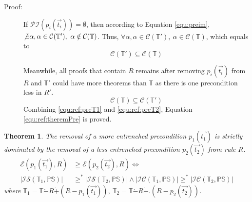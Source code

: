 \documentclass[11pt,letterpaper]{article}
\newtheorem{theorem}{Theorem}[section]
\newcommand{\theory}{\mathbb{T}}
\begin{document}
\begin{description}
\item[Proof:]
 If $\mathcal{PI}(p_i(\vec{t_i})) = \emptyset$, then according to Equation \ref{equ:preim}, $\not\exists \alpha, \alpha \in \mathcal{C}(\theory'),\ \alpha \notin \mathcal{C}(\theory)$. Thus, $\forall \alpha, \alpha \in \mathcal{C}(\theory'),\ \alpha \in \mathcal{C}(\theory)$, which equals to
 \begin{equation}\label{equ:ref:preT1}
     \mathcal{C}(\theory')\subseteq \mathcal{C}(\theory)
 \end{equation}
 
 Meanwhile, all proofs that contain $R$ remains after removing $p_i(\vec{t_i})$ from $R$ and $\theory'$ could have more theorems than $\theory$ as there is one precondition less in $R'$.
 \begin{equation}\label{equ:ref:preT2}
 \mathcal{C}(\theory)\subseteq \mathcal{C}(\theory')
 \end{equation}
 Combining \ref{equ:ref:preT1} and \ref{equ:ref:preT2}, Equation \ref{equ:ref:theremPre} is proved.
\end{description}


\begin{theorem}\label{the:def:precE}
The removal of a more entrenched precondition $p_1(\vec{t_1})$ is strictly dominated by the removal of a less entrenched precondition $p_2(\vec{t_2})$ from rule $R$.
\begin{align*}
    \mathcal{E}(p_1(\vec{t_1}), R) &\geq\mathcal{E}(p_2(\vec{t_2}), R) \iff   \\
    |\mathcal{IS}(\theory_1, \mathbb{PS}) | & \geq^*  |\mathcal{IS}(\theory_2, \mathbb{PS})|\wedge
   |\mathcal{IC}(\theory_1, \mathbb{PS})| \geq^* |\mathcal{IC}(\theory_2, \mathbb{PS})|
\end{align*}
where $\theory_1 = \theory \dot{-} R \dot{+} (R-p_1(\vec{t_1})),\ \theory_2 = \theory \dot{-} R \dot{+}. (R-p_2(\vec{t_2})) $.
\end{theorem}
\end{document}
